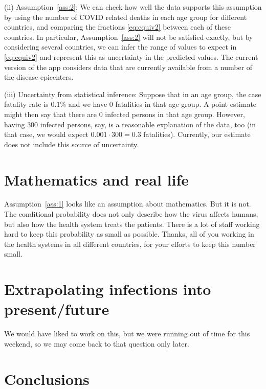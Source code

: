 \documentclass[a4paper]{article}
\begin{document}
(ii) Assumption~\ref{ass:2}: We can check 
how well the data supports 
this assumption by using 
the number of COVID related deaths in each age group for different countries, 
and comparing the fractions \eqref{eq:equiv2} between each of these countries.
In particular, Assumption~\ref{ass:2} will not be satisfied exactly, but 
by considering several countries, we can 
infer the range of values to expect in \eqref{eq:equiv2}
and represent this as uncertainty in the predicted values. 
The current version of the app considers data that are currently available from a number of the disease epicenters.

(iii) Uncertainty from statistical inference: 
Suppose that in an age group, the case fatality rate is $0.1\%$ and we have 
$0$ fatalities in that age group.
A point estimate might then say that there are $0$ infected persons
in that age group. However, having $300$ infected persons, say,
is a reasonable explanation of the data, too (in that case, we would expect $0.001\cdot 300 = 0.3$ fatalities).
Currently, our estimate does not include this source of uncertainty.


\section{Mathematics and real life}
Assumption~\ref{ass:1} looks like an assumption about mathematics. 
But it is not. 
The conditional probability does not 
only describe how
the virus affects humans, 
but also how the health system treats the patients. 
There is a lot of staff working hard to 
keep this probability as small as possible. 
Thanks, all of you working in the health systems in all different countries, for 
your efforts to keep this number small. 




\section{Extrapolating infections into present/future}
We would have liked to work on this, but we were running out of time for this weekend, so we may come back to that question only later.

\section{Conclusions}

\begin{center}
\end{center}
\end{document}
